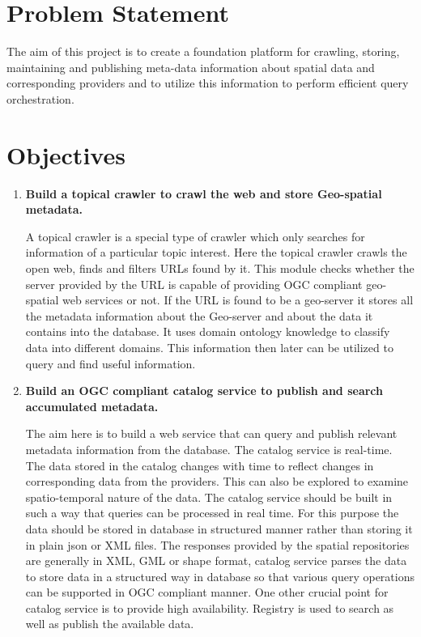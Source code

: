 \section{Problem Statement}
The aim of this project is to create a foundation platform for crawling, storing, maintaining and publishing meta-data information about spatial data and corresponding providers and to utilize this information to perform efficient query orchestration.


\section{Objectives}

\begin{enumerate}

\item \textbf{Build a topical crawler to crawl the web and store Geo-spatial metadata.}
\par
\indent A topical crawler is a special type of crawler which only searches for information of a particular topic interest. Here the topical crawler crawls the open web, finds and filters URLs found by it. This module checks whether the server provided by the URL is capable of providing OGC compliant geo-spatial web services or not. If the URL is found to be a geo-server it stores all the metadata information about the Geo-server and about the data it contains into the database. It uses domain ontology knowledge to classify data into different domains. This information then later can be utilized to query and find useful information.
\newline
\item \textbf{Build an OGC compliant catalog service to publish and search accumulated metadata.}
\par
The aim here is to build a web service that can query and publish relevant metadata information from the database. The catalog service is real-time. The data stored in the catalog changes with time to reflect changes in corresponding data from the providers. This can also be explored to examine spatio-temporal nature of the data. The catalog service should be built in such a way that queries can be processed in real time. For this purpose the data should be stored in database in structured manner rather than storing it in plain json or XML files. The responses provided by the spatial repositories are generally in XML, GML or shape format, catalog service parses the data to store data in a structured way in database so that various query operations can be supported in OGC compliant manner. One other crucial point for catalog service is to provide high availability. Registry is used to search as well as publish the available data.\\

\end{enumerate}
